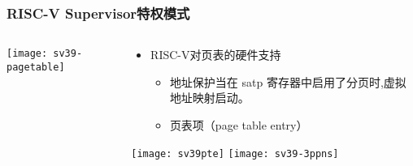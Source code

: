 \begin{frame}   
	\frametitle{RISC-V Supervisor特权模式}
	
	\begin{columns}[t]
		
		\begin{column}{.5\textwidth}
			
			\texttt{[image: sv39-pagetable]}
			
		\end{column}
		
		
		\begin{column}{.5\textwidth}
			
			\begin{itemize}\large
				\item RISC-V对页表的硬件支持
				\begin{itemize}
					\item 地址保护当在 satp 寄存器中启用了分页时,虚拟地址映射启动。
					\item 页表项（page table entry）
					
					
				\end{itemize}
			\end{itemize}
			\texttt{[image: sv39pte]}
			\texttt{[image: sv39-3ppns]}
			

			
		\end{column}
		
		
	\end{columns}
	
\end{frame}

